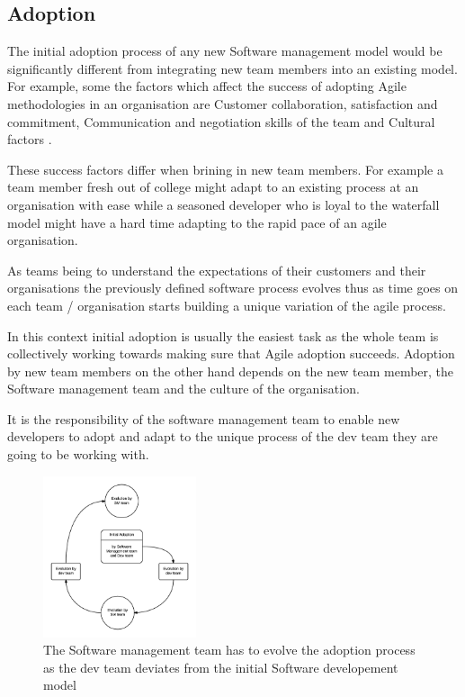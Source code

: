 \documentclass[10pt,conference]{IEEEtran}
\begin{document}
\subsection*{Adoption}
The initial adoption process of any new Software management model would be significantly different from integrating new team members into an existing model. For example, some the factors which affect the success of adopting Agile methodologies in an organisation are 
Customer collaboration, satisfaction and commitment, Communication and negotiation skills of the team and Cultural factors \cite{misra_identifying_2009}.

These success factors differ when brining in new team members. For example a team member fresh out of college might adapt to an existing process at an organisation with ease while a seasoned developer who is loyal to the waterfall model might have a hard time adapting to the rapid pace of an agile organisation. 

As teams being to understand the expectations of their customers and their organisations the previously defined software process evolves thus as time goes on each team / organisation starts building a unique variation of the agile process.

In this context initial adoption is usually the easiest task as the whole team is collectively working towards making sure that Agile adoption succeeds. Adoption by new team members on the other hand depends on the new team member, the Software management team and the culture of the organisation.

It is the responsibility of the software management team to enable new developers to adopt and adapt to the unique process of the dev team they are going to be working with.

\begin{figure}[t]
\centering
\includegraphics[width=0.4\textwidth]{sm_dev_team_process_evolution.png}
\caption{The Software management team has to evolve the adoption process as the dev team deviates from the initial Software developement model}
\end{figure}
\end{document}
